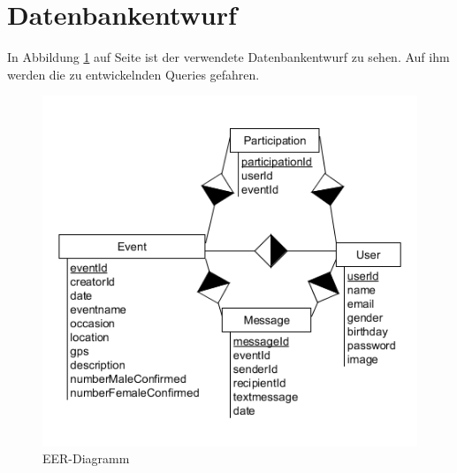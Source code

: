 \section{Datenbankentwurf}\label{Datenbankentwurf}
In Abbildung \ref{fig:EER-Diagramm} auf Seite \pageref{fig:EER-Diagramm} ist der verwendete Datenbankentwurf zu sehen. Auf ihm werden die zu entwickelnden Queries gefahren.

\begin{figure}[htp]
\centering
\includegraphics[width=1\textwidth]{Ingo/Bilder/EER-Diagramm.png}
\caption{EER-Diagramm}
\label{fig:EER-Diagramm}
\end{figure}